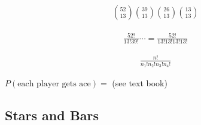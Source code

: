 \begin{align*}
    {52 \choose 13}{39 \choose 13}{26 \choose 13}{13 \choose 13}
\end{align*}

\begin{align*}
    \frac{52!}{13!39!} \cdots = \frac{52!}{13!13!13!13!}
\end{align*}

\begin{align*}
    \frac{n!}{n_1!n_2!n_3!n_4!}
\end{align*}

$P(\text{each player gets ace}) = $ (see text book)

\subsection{Stars and Bars}
